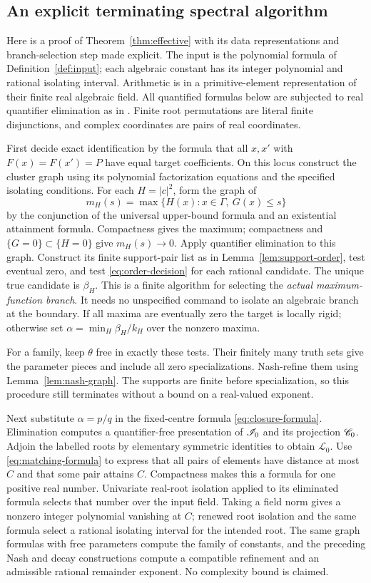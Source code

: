 \subsection{An explicit terminating spectral algorithm}
Here is a proof of Theorem~\ref{thm:effective} with its data representations
and branch-selection step made explicit. The input is the polynomial
formula of Definition~\ref{def:input}; each algebraic constant has its
integer polynomial and rational isolating interval. Arithmetic is in a
primitive-element representation of their finite real algebraic field.
All quantified formulas below are subjected to real quantifier elimination
as in \cite{BPR06}. Finite root permutations are literal finite
disjunctions, and complex coordinates are pairs of real coordinates.

First decide exact identification by the formula that all $x,x'$ with
$F(x)=F(x')=P$ have equal target coefficients. On this locus construct
the cluster graph using its polynomial factorization equations and the
specified isolating conditions. For each $H=|c|^2$, form the graph of
\[
 m_H(s)=\max\{H(x):x\in\Gamma,\ G(x)\le s\}
\]
by the conjunction of the universal upper-bound formula and an existential
attainment formula. Compactness gives the maximum; compactness and
$\{G=0\}\subset\{H=0\}$ give $m_H(s)\to0$. Apply quantifier
elimination to this graph. Construct its finite support-pair list as in
Lemma~\ref{lem:support-order}, test eventual zero, and test
\eqref{eq:order-decision} for each rational candidate. The unique true
candidate is $\beta_H$. This is a finite algorithm for selecting the
\emph{actual maximum-function branch}. It needs no unspecified command
to isolate an algebraic branch at the boundary. If all maxima are eventually
zero the target is locally rigid; otherwise set
$\alpha=\min_H\beta_H/k_H$ over the nonzero maxima.

For a family, keep $\theta$ free in exactly these tests. Their finitely
many truth sets give the parameter pieces and include all zero
specializations. Nash-refine them using Lemma~\ref{lem:nash-graph}.
The supports are finite before specialization, so this procedure still
terminates without a bound on a real-valued exponent.

Next substitute $\alpha=p/q$ in the fixed-centre formula
\eqref{eq:closure-formula}. Elimination computes a quantifier-free
presentation of $\mathscr I_0$ and its projection $\mathscr C_0$. Adjoin the labelled
roots by elementary symmetric identities to obtain $\mathcal L_0$.
Use \eqref{eq:matching-formula} to express that all pairs of elements
have distance at most $C$ and that some pair attains $C$. Compactness
makes this a formula for one positive real number. Univariate real-root
isolation applied to its eliminated formula selects that number over the
input field. Taking a field norm gives a nonzero integer polynomial
vanishing at $C$; renewed root isolation and the same formula select a
rational isolating interval for the intended root. The same graph formulas
with free parameters compute the family of constants, and the preceding
Nash and decay constructions compute a compatible refinement and an
admissible rational remainder exponent. No complexity bound is claimed.

